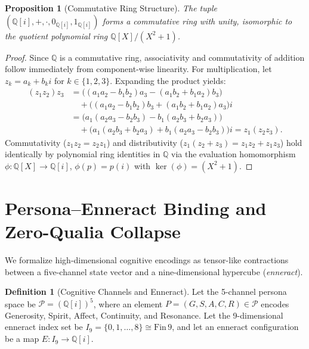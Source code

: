 \documentclass[11pt,a4paper]{article}
\theoremstyle{definition}
\newtheorem{definition}{Definition}[section]
\theoremstyle{plain}
\newtheorem{proposition}[theorem]{Proposition}
\theoremstyle{remark}
\newcommand{\Q}{\mathbb{Q}}
\newcommand{\Qi}{\mathbb{Q}[i]}
\begin{document}
\begin{proposition}[Commutative Ring Structure]
The tuple $(\Qi, +, \cdot, 0_{\Qi}, 1_{\Qi})$ forms a commutative ring with unity, isomorphic to the quotient polynomial ring $\Q[X]/(X^2 + 1)$.
\end{proposition}

\begin{proof}
Since $\Q$ is a commutative ring, associativity and commutativity of addition follow immediately from component-wise linearity. For multiplication, let $z_k = a_k + b_k i$ for $k \in \{1,2,3\}$. Expanding the product yields:
\begin{align*}
    (z_1 z_2) z_3 &= \bigl((a_1 a_2 - b_1 b_2)a_3 - (a_1 b_2 + b_1 a_2)b_3\bigr) \\
    &\quad + \bigl((a_1 a_2 - b_1 b_2)b_3 + (a_1 b_2 + b_1 a_2)a_3\bigr)i \\
    &= \bigl(a_1(a_2 a_3 - b_2 b_3) - b_1(a_2 b_3 + b_2 a_3)\bigr) \\
    &\quad + \bigl(a_1(a_2 b_3 + b_2 a_3) + b_1(a_2 a_3 - b_2 b_3)\bigr)i = z_1 (z_2 z_3).
\end{align*}
Commutativity ($z_1 z_2 = z_2 z_1$) and distributivity ($z_1(z_2 + z_3) = z_1 z_2 + z_1 z_3$) hold identically by polynomial ring identities in $\Q$ via the evaluation homomorphism $\phi : \Q[X] \to \Qi$, $\phi(p) = p(i)$ with $\ker(\phi) = (X^2 + 1)$.
\end{proof}

\section{Persona--Enneract Binding and Zero-Qualia Collapse}

We formalize high-dimensional cognitive encodings as tensor-like contractions between a five-channel state vector and a nine-dimensional hypercube (\textit{enneract}).

\begin{definition}[Cognitive Channels and Enneract]
Let the 5-channel persona space be $\mathcal{P} = (\Qi)^5$, where an element $P = (G, S, A, C, R) \in \mathcal{P}$ encodes Generosity, Spirit, Affect, Continuity, and Resonance. Let the 9-dimensional enneract index set be $I_9 = \{0, 1, \dots, 8\} \cong \mathrm{Fin}\,9$, and let an enneract configuration be a map $E : I_9 \to \Qi$.
\end{definition}
\end{document}
